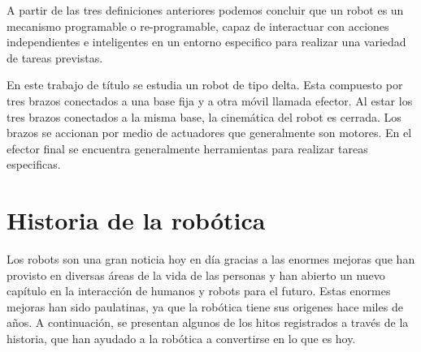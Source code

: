     A partir de las tres definiciones anteriores podemos concluir que un robot es un mecanismo programable o re-programable, capaz de interactuar con acciones independientes e inteligentes en un entorno especifico para realizar una variedad de tareas previstas.
    
    En este trabajo de título se estudia un robot de tipo delta. Esta compuesto por tres brazos conectados a una base fija y a otra móvil llamada efector. Al estar los tres brazos conectados a la misma base, la cinemática del robot es cerrada. Los brazos se accionan por medio de actuadores que generalmente son motores. En el efector final se encuentra generalmente herramientas para realizar tareas especificas.
    
    \newpage
\section{Historia de la robótica}
    
    Los robots son una gran noticia hoy en día gracias a las enormes mejoras que han provisto en diversas áreas de la vida de las personas y han abierto un nuevo capítulo en la interacción de humanos y robots para el futuro. Estas enormes mejoras han sido paulatinas, ya que la robótica tiene sus origenes hace miles de años. A continuación, se presentan algunos de los hitos registrados a través de la historia, que han ayudado a la robótica a convertirse en lo que es hoy.
    
